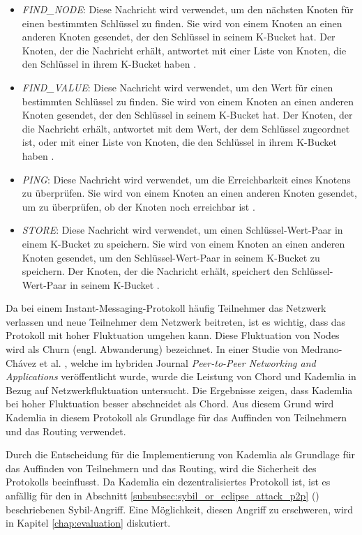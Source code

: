 \begin{itemize}
    \item \textit{FIND\_NODE}: Diese Nachricht wird verwendet, um den nächsten Knoten für einen bestimmten Schlüssel zu finden. Sie wird von einem Knoten an einen anderen Knoten gesendet, der den Schlüssel in seinem K-Bucket hat. Der Knoten, der die Nachricht erhält, antwortet mit einer Liste von Knoten, die den Schlüssel in ihrem K-Bucket haben \Parencite[S. 3]{Maymounkov_Kademlia}. 
    \item \textit{FIND\_VALUE}: Diese Nachricht wird verwendet, um den Wert für einen bestimmten Schlüssel zu finden. Sie wird von einem Knoten an einen anderen Knoten gesendet, der den Schlüssel in seinem K-Bucket hat. Der Knoten, der die Nachricht erhält, antwortet mit dem Wert, der dem Schlüssel zugeordnet ist, oder mit einer Liste von Knoten, die den Schlüssel in ihrem K-Bucket haben \Parencite[S. 3]{Maymounkov_Kademlia}.
    \item \textit{PING}: Diese Nachricht wird verwendet, um die Erreichbarkeit eines Knotens zu überprüfen. Sie wird von einem Knoten an einen anderen Knoten gesendet, um zu überprüfen, ob der Knoten noch erreichbar ist \Parencite[S. 2-3]{Maymounkov_Kademlia}.
    \item \textit{STORE}: Diese Nachricht wird verwendet, um einen Schlüssel-Wert-Paar in einem K-Bucket zu speichern. Sie wird von einem Knoten an einen anderen Knoten gesendet, um den Schlüssel-Wert-Paar in seinem K-Bucket zu speichern. Der Knoten, der die Nachricht erhält, speichert den Schlüssel-Wert-Paar in seinem K-Bucket \Parencite[S. 3]{Maymounkov_Kademlia}.
\end{itemize}

\noindent Da bei einem Instant-Messaging-Protokoll häufig Teilnehmer das Netzwerk verlassen und neue Teilnehmer dem Netzwerk beitreten, ist es wichtig, dass das Protokoll mit hoher Fluktuation umgehen kann. Diese Fluktuation von Nodes wird als Churn (engl. Abwanderung) bezeichnet. In einer Studie von Medrano-Chávez et al. \parencite{MedranoChavez_ChordKademliaHighChurnScenarios}, welche im hybriden Journal \textit{Peer-to-Peer Networking and Applications} veröffentlicht wurde, wurde die Leistung von Chord und Kademlia in Bezug auf Netzwerkfluktuation untersucht. Die Ergebnisse zeigen, dass Kademlia bei hoher Fluktuation besser abschneidet als Chord. Aus diesem Grund wird Kademlia in diesem Protokoll als Grundlage für das Auffinden von Teilnehmern und das Routing verwendet.


Durch die Entscheidung für die Implementierung von Kademlia als Grundlage für das Auffinden von Teilnehmern und das Routing, wird die Sicherheit des Protokolls beeinflusst. Da Kademlia ein dezentralisiertes Protokoll ist, ist es anfällig für den in Abschnitt \ref{subsubsec:sybil_or_eclipse_attack_p2p} (\textit{}) beschriebenen Sybil-Angriff. Eine Möglichkeit, diesen Angriff zu erschweren, wird in Kapitel \ref{chap:evaluation} \textit{} diskutiert.

